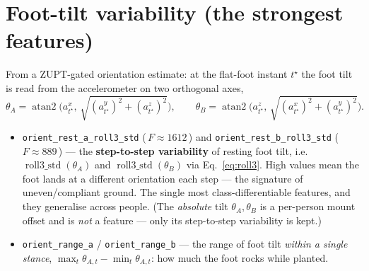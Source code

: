 \documentclass[11pt]{article}
\newcommand{\code}[1]{\texttt{#1}}
\newcommand{\Fval}[1]{{\small(\,$F\!\approx\!#1$\,)}}
\begin{document}
\section{Foot-tilt variability (the strongest features)}
From a ZUPT-gated orientation estimate: at the flat-foot instant $t^\star$ the foot tilt is read
from the accelerometer on two orthogonal axes,
\begin{equation}
\theta_A=\operatorname{atan2}\!\bigl(a^x_{t^\star},\,\sqrt{(a^y_{t^\star})^2+(a^z_{t^\star})^2}\bigr),
\qquad
\theta_B=\operatorname{atan2}\!\bigl(a^z_{t^\star},\,\sqrt{(a^x_{t^\star})^2+(a^y_{t^\star})^2}\bigr).
\end{equation}
\begin{itemize}
  \item \code{orient_rest_a_roll3_std} \Fval{1612} and \code{orient_rest_b_roll3_std} \Fval{889}
  --- the \textbf{step-to-step variability} of resting foot tilt, i.e.\
  $\operatorname{roll3\_std}(\theta_A)$ and $\operatorname{roll3\_std}(\theta_B)$ via
  Eq.~\eqref{eq:roll3}. High values mean the foot lands at a different orientation each step --- the
  signature of uneven/compliant ground. The single most class-differentiable features, and they
  generalise across people. (The \emph{absolute} tilt $\theta_A,\theta_B$ is a per-person mount
  offset and is \emph{not} a feature --- only its step-to-step variability is kept.)
  \item \code{orient_range_a} / \code{orient_range_b} --- the range of foot tilt \emph{within a
  single stance}, $\max_t\theta_{A,t}-\min_t\theta_{A,t}$: how much the foot rocks while planted.
\end{itemize}
\end{document}
